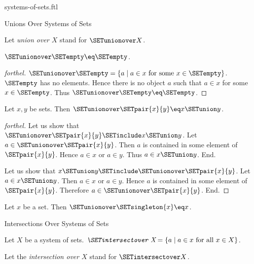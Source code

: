 \documentclass{naproche-library}
\begin{document}
\begin{smodule}[title=Systems of Sets]{systems-of-sets.ftl}
\begin{sfragment}{Unions Over Systems of Sets}
\begin{definition}[forthel,id=FOUNDATIONS_10_541772562300928]
    Let \emph{union over $X$} stand for $\SETunionover X$.
  \end{definition}

  \begin{proposition}[forthel,id=FOUNDATIONS_10_4872701241982976]
    $\SETunionover \SETempty \eq \SETempty$.
  \end{proposition}
  \begin{proof}[forthel]
    $\SETunionover \SETempty = \{ a \mid a \in x\text{ for some }x \in \SETempty \}$.
    $\SETempty$ has no elements.
    Hence there is no object $a$ such that $a \in x$ for some $x \in \SETempty$.
    Thus $\SETunionover \SETempty \eq \SETempty$.
  \end{proof}

  \begin{proposition}[forthel,id=FOUNDATIONS_10_2559541585641472]
    Let $x, y$ be sets.
    Then $\SETunionover \SETpair{x}{y} \eq x \SETunion y$.
  \end{proposition}
  \begin{proof}[forthel]
    Let us show that $\SETunionover \SETpair{x}{y} \SETinclude x \SETunion y$.
      Let $a \in \SETunionover \SETpair{x}{y}$.
      Then $a$ is contained in some element of $\SETpair{x}{y}$.
      Hence $a \in x$ or $a \in y$.
      Thus $a \in x \SETunion y$.
    End.

    Let us show that $x \SETunion y \SETinclude \SETunionover \SETpair{x}{y}$.
      Let $a \in x \SETunion y$.
      Then $a \in x$ or $a \in y$.
      Hence $a$ is contained in some element of $\SETpair{x}{y}$.
      Therefore $a \in \SETunionover \SETpair{x}{y}$.
    End.
  \end{proof}

  \begin{corollary}[forthel,id=FOUNDATIONS_10_2157223832715264]
    Let $x$ be a set.
    Then $\SETunionover \SETsingleton{x} \eq x$.
  \end{corollary}
\end{sfragment}

\begin{sfragment}{Intersections Over Systems of Sets}
  \begin{definition}[forthel,id=FOUNDATIONS_10_2659345095458816]
    Let $X$ be a system of sets.
    $\emph{\SETintersectover X} = \{ a \mid a \in x\text{ for all }x \in X \}$.

    Let the \emph{intersection over $X$} stand for $\SETintersectover X$.
  \end{definition}


\end{sfragment}
\end{smodule}
\end{document}
